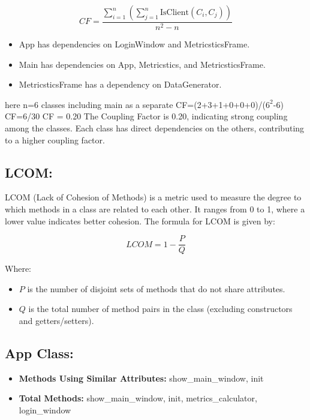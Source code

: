{{{{\begin{equation}
    CF = \frac{\sum_{i=1}^{n} \left( \sum_{j=1}^{n} \text{IsClient}(C_i, C_j) \right)}{n^2 - n}
\end{equation}
\newline
\normalsize{
\begin{itemize}
    \item App has dependencies on LoginWindow and MetricsticsFrame.
    \item Main has dependencies on App, Metricstics, and MetricsticsFrame.
    \item MetricsticsFrame has a dependency on DataGenerator.
\end{itemize}
\normalsize{here n=6 classes including main as a separate}
CF=(2+3+1+0+0+0)/($6^{2}$-6)\linebreak \linebreak
CF=6/30\linebreak \linebreak
CF = 0.20\linebreak \linebreak
The Coupling Factor is 0.20, indicating strong coupling among the classes. Each class has direct dependencies on the others, contributing to a higher coupling factor.
}

\subsection{LCOM: }

LCOM (Lack of Cohesion of Methods) is a metric used to measure the degree to which methods in a class are related to each other. It ranges from 0 to 1, where a lower value indicates better cohesion. The formula for LCOM is given by:

\[
LCOM = 1 - \frac{P}{Q}
\]

Where:

\begin{itemize}
    \item \(P\) is the number of disjoint sets of methods that do not share attributes.
    \item \(Q\) is the total number of method pairs in the class (excluding constructors and getters/setters).
\end{itemize}


 \subsection*{App Class: }
\begin{itemize}
    \item \textbf{Methods Using Similar Attributes:} show\_main\_window, init
    \item \textbf{Total Methods:} show\_main\_window, init, metrics\_calculator, login\_window
\end{itemize}

}}}}
